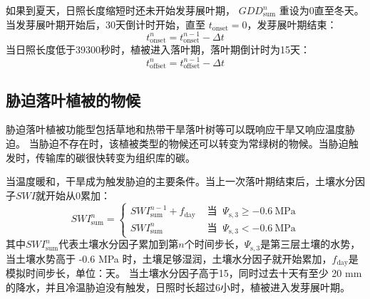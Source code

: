 如果到夏天，日照长度缩短时还未开始发芽展叶期，
$GDD_{\mathrm{sum}}^n$ 重设为0直至冬天。当发芽展叶期开始后，30天倒计时开始，直至 $t_{\mathrm{onset}}=0$，发芽展叶期结束：
%
\begin{equation}
  t_{\mathrm{onset}}^n=t_{\mathrm{onset}}^{n-1}-\Delta t
\end{equation}
当日照长度低于39300秒时，植被进入落叶期，落叶期倒计时为15天：
\begin{equation}
  t_{\mathrm{offset}}^n=t_{\mathrm{offset}}^{n-1}-\Delta t
\end{equation}


\subsection{胁迫落叶植被的物候}

胁迫落叶植被功能型包括草地和热带干旱落叶树等可以既响应干旱又响应温度胁迫。
当胁迫不存在时，该植被类型的物候还可以转变为常绿树的物候。当胁迫触发时，传输库的碳很快转变为组织库的碳。


当温度暖和，干旱成为触发胁迫的主要条件。当上一次落叶期结束后，土壤水分因子$SWI$就开始从0累加：
\begin{equation}
  SWI_{\mathrm{sum}}^{n}=\left\{\begin{array}{ll}SWI_{\mathrm{sum}}^{n-1}+f_{\mathrm{d a y}} & \text{ 当 }\ \Psi_{\mathrm{s, 3}} \geqslant -0.6\ \mathrm{MPa} \\
      SWI_{\mathrm{sum}}^{n} &  \text{ 当 }\ \Psi_{\mathrm{s, 3}}<-0.6\ \mathrm{MPa}
  \end{array}\right.
\end{equation}
其中$SWI_{\mathrm{sum}}^n$代表土壤水分因子累加到第$n$个时间步长，$\Psi_{\mathrm{s,3}}$是第三层土壤的水势，当土壤水势高于 -0.6 MPa 时，土壤足够湿润，土壤水分因子就开始累加，$f_{\mathrm{d a y}}$是模拟时间步长，单位：天。
当土壤水分因子高于15，同时过去十天有至少 20 mm 的降水，并且冷温胁迫没有触发，日照时长超过6小时，植被进入发芽展叶期。


